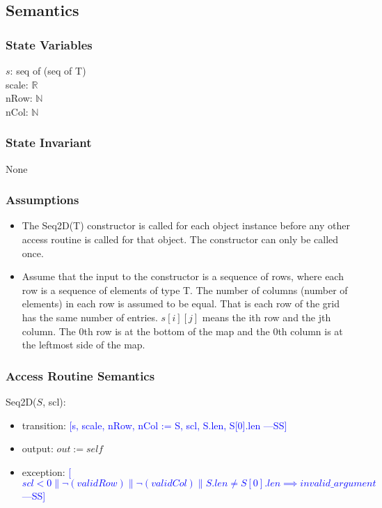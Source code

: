 \documentclass[12pt]{article}
\newcommand{\authornote}[3]{\textcolor{#1}{[#3 ---#2]}}
\newcommand{\authornote}[3]{}
\newcommand{\wss}[1]{\authornote{blue}{SS}{#1}}
\begin{document}
\subsection* {Semantics}

\subsubsection* {State Variables}

$s$: seq of (seq of T)\\
scale: $\mathbb{R}$\\
nRow: $\mathbb{N}$\\
nCol: $\mathbb{N}$

\subsubsection* {State Invariant}

None

\subsubsection* {Assumptions}

\begin{itemize}
\item The Seq2D(T) constructor is called for each object instance before any
other access routine is called for that object.  The constructor can only be
called once.
\item Assume that the input to the constructor is a sequence of rows, where each
  row is a sequence of elements of type T.  The number of columns (number of
  elements) in each row is assumed to be equal. That is each row
  of the grid has the same number of entries.  $s[i][j]$ means the ith row and
  the jth column.  The 0th row is at the bottom of the map and the 0th column
  is at the leftmost side of the map.
\end{itemize}

\subsubsection* {Access Routine Semantics}

Seq2D($S$, scl):
\begin{itemize}
\item transition: \wss{s, scale, nRow, nCol := S, scl, S.len, S[0].len}
\item output: $\mathit{out} := \mathit{self}$
\item exception: \wss{$scl < 0 \| \lnot(validRow) \| \lnot(validCol) \| S.len \neq S[0].len \implies invalid\_argument$}
\end{itemize}
\end{document}
